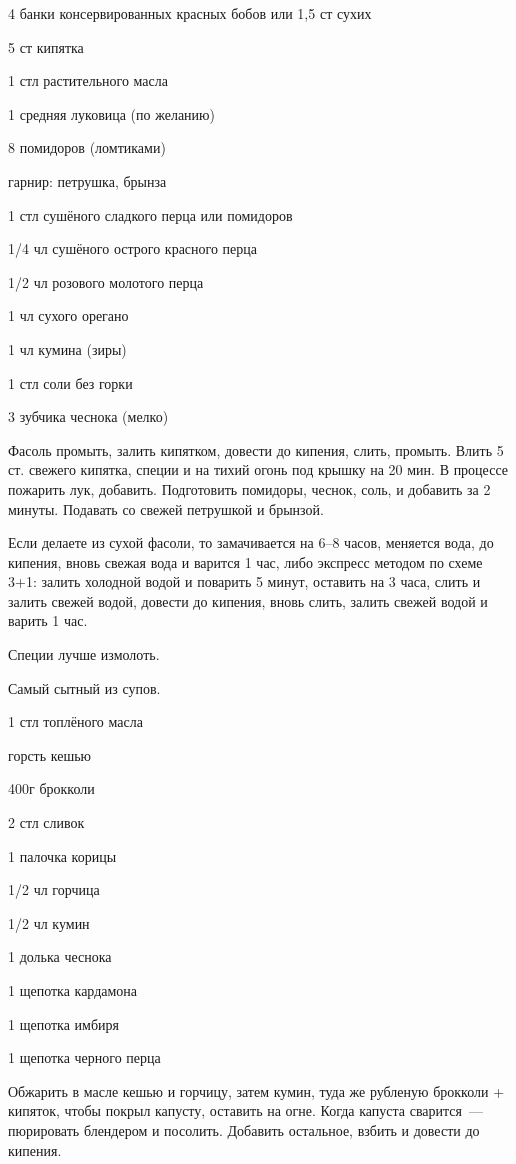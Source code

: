 {
\item 4 банки консервированных красных бобов или 1,5 ст сухих
\item 5 ст кипятка
\item 1 стл растительного масла
\item 1 средняя луковица (по желанию)
\item 8 помидоров (ломтиками)
\item гарнир: петрушка, брынза
}{
\item 1 стл сушёного сладкого перца или помидоров
\item 1/4 чл сушёного острого красного перца
\item 1/2 чл розового молотого перца
\item 1 чл сухого орегано
\item 1 чл кумина (зиры)
\item 1 стл соли без горки
\item 3 зубчика чеснока (мелко)
}{
Фасоль промыть, залить кипятком, довести до кипения, слить, промыть. Влить 5 ст. свежего кипятка, специи и на тихий огонь под крышку на 20 мин. В процессе пожарить лук, добавить. Подготовить помидоры, чеснок, соль, и добавить за 2 минуты. Подавать со свежей петрушкой и брынзой.

Если делаете из сухой фасоли, то замачивается на 6–8 часов, меняется вода, до кипения, вновь свежая вода и варится 1 час, либо экспресс методом по схеме 3+1: залить холодной водой и поварить 5 минут, оставить на 3 часа, слить и залить свежей водой, довести до кипения, вновь слить, залить свежей водой и варить 1 час.
}{
\begin{advice}
\item Специи лучше измолоть.
    \item Самый сытный из супов.
\end{advice}
}{}



{
\item 1 стл топлёного масла
\item горсть кешью
\item 400г брокколи
\item 2 стл сливок
}{
\item 1 палочка корицы
\item 1/2 чл горчица
\item 1/2 чл кумин 
\item 1 долька чеснока
\item 1 щепотка кардамона
\item 1 щепотка имбиря 
\item 1 щепотка черного перца
}{
Обжарить в масле кешью и горчицу, затем кумин, туда же рубленую брокколи + кипяток, чтобы покрыл капусту, оставить на огне. Когда капуста сварится~--- пюрировать блендером и посолить. Добавить остальное, взбить и довести до кипения.
}{}{}


